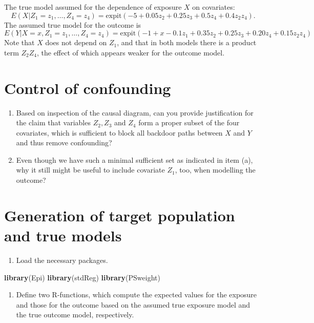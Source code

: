 \documentclass[
]{book}
\newenvironment{Shaded}{\begin{snugshade}}{\end{snugshade}}
\newcommand{\FunctionTok}[1]{\textcolor[rgb]{0.13,0.29,0.53}{\textbf{#1}}}
\newcommand{\NormalTok}[1]{#1}
\providecommand{\tightlist}{%
  \setlength{\itemsep}{0pt}\setlength{\parskip}{0pt}}
\begin{document}
The true model assumed for the dependence of exposure \(X\) on covariates:
\[ E(X|Z_1 = z_1, \dots, Z_4 = z_4) =
      \text{expit}(-5 + 0.05z_2 + 0.25z_3 + 0.5z_4 + 0.4z_2z_4) . \] The
assumed true model for the outcome is
\[ E(Y|X=x, Z_1 = z_1, \dots, Z_4 = z_4) =
           \text{expit}(-1 + x - 0.1z_1 + 0.35z_2 + 0.25z_3 +
                 0.20z_4 + 0.15z_2z_4) \]
Note that \(X\) does not depend on \(Z_1\), and that in both models
there is a product term \(Z_2 Z_4\),
the effect of which appears weaker for the outcome model.

\section{Control of confounding}\label{control-of-confounding}

\begin{enumerate}
\def\labelenumi{\arabic{enumi}.}
\item
  Based on inspection of the causal diagram, can you provide
  justification for the claim that variables
  \(Z_2, Z_3\) and \(Z_4\) form
  a proper subset of the four covariates,
  which is sufficient to block all backdoor paths between \(X\)
  and \(Y\) and thus remove confounding?
\item
  Even though we have such a minimal sufficient set
  as indicated in item (a), why it still might be useful
  to include covariate
  \(Z_1\), too, when modelling the outcome?
\end{enumerate}

\section{Generation of target population and true models}\label{generation-of-target-population-and-true-models}

\begin{enumerate}
\def\labelenumi{\arabic{enumi}.}
\tightlist
\item
  Load the necessary packages.
\end{enumerate}

\begin{Shaded}
\begin{Highlighting}[]
\FunctionTok{library}\NormalTok{(Epi)}
\FunctionTok{library}\NormalTok{(stdReg)}
\FunctionTok{library}\NormalTok{(PSweight)}
\end{Highlighting}
\end{Shaded}

\begin{enumerate}
\def\labelenumi{\arabic{enumi}.}
\setcounter{enumi}{1}
\tightlist
\item
  Define two R-functions, which compute the expected values
  for the exposure and those for the outcome based on the assumed
  true exposure model and the true outcome model, respectively.
\end{enumerate}
\end{document}
